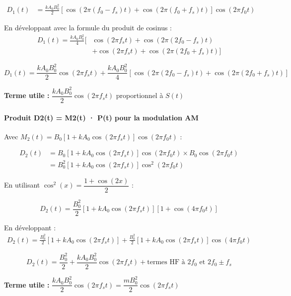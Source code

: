 \documentclass[11pt,a4paper]{article}
\begin{document}
\begin{align}
D_1(t) &= \frac{k A_0 B_0^2}{2} [\cos(2\pi(f_0-f_s)t) + \cos(2\pi(f_0+f_s)t)] \cos(2\pi f_0 t)
\end{align}

En développant avec la formule du produit de cosinus :
\begin{align}
D_1(t) = \frac{k A_0 B_0^2}{4} [&\cos(2\pi f_s t) + \cos(2\pi(2f_0-f_s)t) \\
&+ \cos(2\pi f_s t) + \cos(2\pi(2f_0+f_s)t)]
\end{align}

\begin{equation}
\boxed{D_1(t) = \frac{k A_0 B_0^2}{2} \cos(2\pi f_s t) + \frac{k A_0 B_0^2}{4}[\cos(2\pi(2f_0-f_s)t) + \cos(2\pi(2f_0+f_s)t)]}
\end{equation}

\textbf{Terme utile :} $\dfrac{k A_0 B_0^2}{2} \cos(2\pi f_s t)$ proportionnel à $S(t)$

\paragraph{Produit D2(t) = M2(t) · P(t) pour la modulation AM}

Avec $M_2(t) = B_0[1 + k A_0 \cos(2\pi f_s t)] \cos(2\pi f_0 t)$ :

\begin{align}
D_2(t) &= B_0[1 + k A_0 \cos(2\pi f_s t)] \cos(2\pi f_0 t) \times B_0 \cos(2\pi f_0 t) \\
&= B_0^2[1 + k A_0 \cos(2\pi f_s t)] \cos^2(2\pi f_0 t)
\end{align}

En utilisant $\cos^2(x) = \dfrac{1 + \cos(2x)}{2}$ :

\begin{equation}
D_2(t) = \frac{B_0^2}{2}[1 + k A_0 \cos(2\pi f_s t)][1 + \cos(4\pi f_0 t)]
\end{equation}

En développant :
\begin{align}
D_2(t) = \frac{B_0^2}{2}[1 + k A_0 \cos(2\pi f_s t)] + \frac{B_0^2}{2}[1 + k A_0 \cos(2\pi f_s t)]\cos(4\pi f_0 t)
\end{align}

\begin{equation}
\boxed{D_2(t) = \frac{B_0^2}{2} + \frac{k A_0 B_0^2}{2}\cos(2\pi f_s t) + \text{termes HF à } 2f_0 \text{ et } 2f_0 \pm f_s}
\end{equation}

\textbf{Terme utile :} $\dfrac{k A_0 B_0^2}{2}\cos(2\pi f_s t) = \dfrac{m B_0^2}{2}\cos(2\pi f_s t)$
\end{document}
